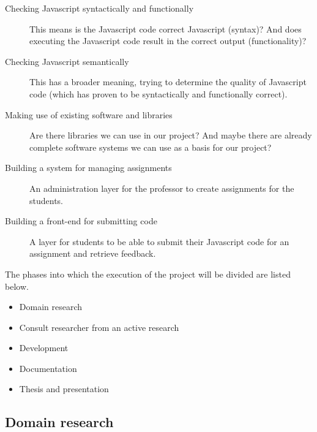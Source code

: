 \documentclass{article}
\begin{document}
\begin{description}
  \item[Checking Javascript syntactically and functionally] This means is the
    Javascript code correct Javascript (syntax)? And does executing the
    Javascript code result in the correct output (functionality)?
  \item[Checking Javascript semantically] This has a broader meaning, trying to
    determine the quality of Javascript code (which has proven to be
    syntactically and functionally correct).
  \item[Making use of existing software and libraries] Are there libraries we
    can use in our project? And maybe there are already complete software
    systems we can use as a basis for our project?
  \item[Building a system for managing assignments] An administration layer for
    the professor to create assignments for the students.
  \item[Building a front-end for submitting code] A layer for students to be
    able to submit their Javascript code for an assignment and retrieve
    feedback.
\end{description}

The phases into which the execution of the project will be divided are listed
below.

\begin{itemize}
  \item Domain research
  \item Consult researcher from an active research
  \item Development
  \item Documentation
  \item Thesis and presentation
\end{itemize}


\subsection{Domain research}
\end{document}
